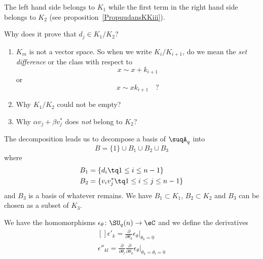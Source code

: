 The left hand side belongs to $K_1$ while the first term in the right hand side belongs to $K_2$ (see proposition~\ref{PropuudansKKiii}).

\begin{probleme}
	Why does it prove that $d_j\in K_1/K_2$?
	\begin{enumerate}
		\item
		      $K_m$ is not a vector space. So when we write $K_i/K_{i+1}$, do we mean the \emph{set difference} or the class with respect to
		      \begin{equation}
			      x\sim x+k_{i+1}
		      \end{equation}
		      or
		      \begin{equation}
			      x\sim xk_{i+1}\quad ?
		      \end{equation}
		\item
		      Why $K_1/K_2$ could not be empty?
		\item
		      Why $\alpha v_j+\beta v_j^*$ does \emph{not} belong to $K_2$?
	\end{enumerate}

\end{probleme}

The decomposition leads us to decompose a basis of $\suqA_q$ into
\begin{equation}
	B=\{ 1 \}\cup B_1\cup B_2\cup B_3
\end{equation}
where
\begin{equation}
	\begin{aligned}[]
		B_1 & =\{ d_i\tq 1\leq i\leq n-1 \}            \\
		B_2 & =\{ v_iv_j^*\tq 1\leq i\leq j\leq n-1 \}
	\end{aligned}
\end{equation}
and $B_3$ is a basis of whatever remains. We have $B_1\subset K_1$, $B_2\subset K_2$ and $B_3$ can be chosen as a subset of $K_3$.


We have the homomorphisms $\epsilon_{\theta}\colon \SU_q(n)\to \eC$ and we define the derivatives
\begin{equation}
	\begin{aligned}[]
		\epsilon'_k=\frac{ \partial  }{ \partial \theta_k }\epsilon_{\theta}|_{\theta_k=0} \\
		\epsilon''_{kl}=\frac{ \partial  }{ \partial \theta_l }\frac{ \partial  }{ \partial \theta_k }\epsilon_{\theta}|_{\theta_k=\theta_l=0}
	\end{aligned}
\end{equation}

